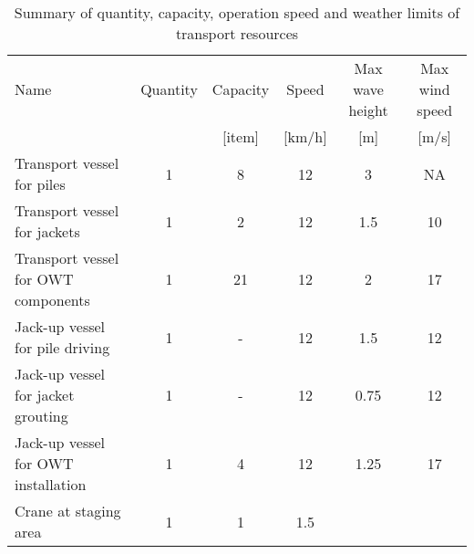 \begin{table}
\label{tab:input}
\begin{tabular}{lccccc}
\hline 
Name & Quantity & Capacity & Speed & Max wave height & Max wind speed \\
& & [item] & [km/h] & [m] & [m/s] \\ 
\hline 
Transport vessel for piles & 1 & 8 & 12 & 3 & NA \\ 
Transport vessel for jackets & 1 & 2 & 12 & 1.5 & 10 \\ 
Transport vessel for OWT components & 1 & 21 & 12 & 2 & 17 \\ 
Jack-up vessel for pile driving & 1 & - & 12 & 1.5 & 12\\
Jack-up vessel for jacket grouting & 1 & - & 12 & 0.75 & 12\\
Jack-up vessel for OWT installation & 1 & 4 & 12 & 1.25 & 17 \\
Crane at staging area & 1 & 1 & 1.5 & & \\
\hline 
\end{tabular}

\caption{Summary of quantity, capacity, operation speed and weather limits of transport resources}
\end{table}
